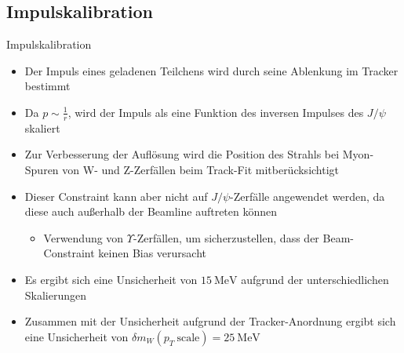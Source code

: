 \documentclass[aspectratio=1610, 9pt]{beamer}
\begin{document}
\subsection{Impulskalibration}

\begin{frame}{Impulskalibration}
  \begin{itemize}
    \item Der Impuls eines geladenen Teilchens wird durch seine Ablenkung im Tracker bestimmt
    \item Da $p \sim \frac{1}{r}$, wird der Impuls als eine Funktion des inversen Impulses des $J/\psi$ skaliert
    \item Zur Verbesserung der Auflösung wird die Position des Strahls bei Myon-Spuren von W- und Z-Zerfällen beim Track-Fit mitberücksichtigt
  \end{itemize}
\end{frame}

\begin{frame}
  \begin{itemize}
    \item Dieser Constraint kann aber nicht auf $J/\psi$-Zerfälle angewendet werden, da diese auch außerhalb der Beamline auftreten können
    \begin{itemize}
      \item[\rightarrow] Verwendung von $\Upsilon$-Zerfällen, um sicherzustellen, dass der Beam-Constraint keinen Bias verursacht
    \end{itemize}
    \item Es ergibt sich eine Unsicherheit von $\SI{15}{\MeV}$ aufgrund der unterschiedlichen Skalierungen
    \item Zusammen mit der Unsicherheit aufgrund der Tracker-Anordnung ergibt sich eine Unsicherheit von $\delta m_W (p_T \: \text{scale}) = \SI{25}{\MeV}$
  \end{itemize}
\end{frame}
\end{document}

